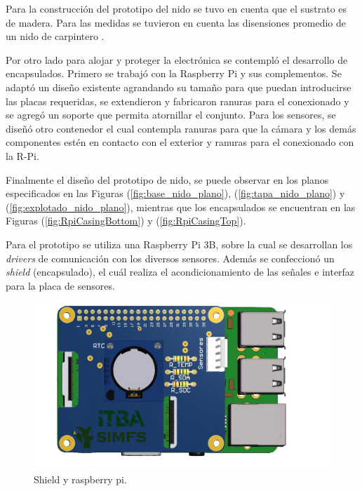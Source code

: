 Para la construcción del prototipo del nido se tuvo en cuenta que el sustrato es de madera. Para las medidas se tuvieron en cuenta las disensiones promedio de un nido de carpintero \cite{ref:PaperValeriaOjeda}.

Por otro lado para alojar y proteger la electrónica se contempló el desarrollo de encapsulados. Primero se trabajó con la Raspberry Pi y sus complementos. Se adaptó un diseño existente agrandando su tamaño para que puedan introducirse las placas requeridas, se extendieron y fabricaron ranuras para el conexionado y se agregó un soporte que permita atornillar el conjunto. Para los sensores, se diseñó otro contenedor el cual contempla ranuras para que la cámara y los demás componentes estén en contacto con el exterior y ranuras para el conexionado con la R-Pi.

Finalmente el diseño del prototipo de nido, se puede observar en los planos especificados en las Figuras (\ref{fig:base_nido_plano}), (\ref{fig:tapa_nido_plano}) y (\ref{fig:explotado_nido_plano}), mientras que los encapsulados se encuentran en las Figuras (\ref{fig:RpiCasingBottom}) y (\ref{fig:RpiCasingTop}).


Para el prototipo se utiliza una Raspberry Pi 3B, sobre la cual se desarrollan los \textit{drivers} de comunicación con los diversos sensores. Además se confeccionó un \textit{shield} (encapsulado), el cuál realiza el acondicionamiento de las señales e interfaz para la placa de sensores.
\begin{figure}[H]
	\centering
	\includegraphics[width=0.9\linewidth,page=1]{ImagenesConstruccion del prototipo/shieldSensor}		
	\caption{Shield  y raspberry pi.}
	\label{fig:shield}
\end{figure}

